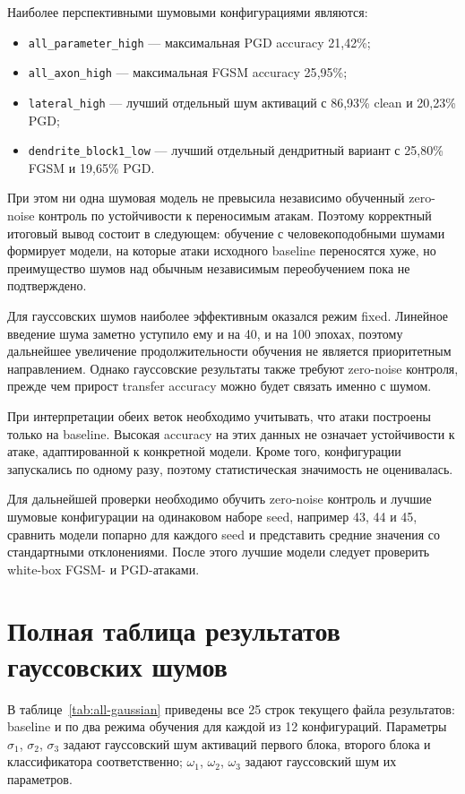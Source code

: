 \documentclass[a4paper]{article}
\begin{document}
Наиболее перспективными шумовыми конфигурациями являются:

\begin{itemize}
    \item \texttt{all\_parameter\_high} --- максимальная PGD accuracy 21{,}42\%;
    \item \texttt{all\_axon\_high} --- максимальная FGSM accuracy 25{,}95\%;
    \item \texttt{lateral\_high} --- лучший отдельный шум активаций с 86{,}93\% clean и 20{,}23\% PGD;
    \item \texttt{dendrite\_block1\_low} --- лучший отдельный дендритный вариант с 25{,}80\% FGSM и 19{,}65\% PGD.
\end{itemize}

При этом ни одна шумовая модель не превысила независимо обученный zero-noise контроль по устойчивости к переносимым атакам. Поэтому корректный итоговый вывод состоит в следующем: обучение с человекоподобными шумами формирует модели, на которые атаки исходного baseline переносятся хуже, но преимущество шумов над обычным независимым переобучением пока не подтверждено.

Для гауссовских шумов наиболее эффективным оказался режим fixed. Линейное введение шума заметно уступило ему и на 40, и на 100 эпохах, поэтому дальнейшее увеличение продолжительности обучения не является приоритетным направлением. Однако гауссовские результаты также требуют zero-noise контроля, прежде чем прирост transfer accuracy можно будет связать именно с шумом.

При интерпретации обеих веток необходимо учитывать, что атаки построены только на baseline. Высокая accuracy на этих данных не означает устойчивости к атаке, адаптированной к конкретной модели. Кроме того, конфигурации запускались по одному разу, поэтому статистическая значимость не оценивалась.

Для дальнейшей проверки необходимо обучить zero-noise контроль и лучшие шумовые конфигурации на одинаковом наборе seed, например 43, 44 и 45, сравнить модели попарно для каждого seed и представить средние значения со стандартными отклонениями. После этого лучшие модели следует проверить white-box FGSM- и PGD-атаками.

\appendix
\section{Полная таблица результатов гауссовских шумов}

В таблице~\ref{tab:all-gaussian} приведены все 25 строк текущего файла результатов: baseline и по два режима обучения для каждой из 12 конфигураций. Параметры $\sigma_1$, $\sigma_2$, $\sigma_3$ задают гауссовский шум активаций первого блока, второго блока и классификатора соответственно; $\omega_1$, $\omega_2$, $\omega_3$ задают гауссовский шум их параметров.
\end{document}
